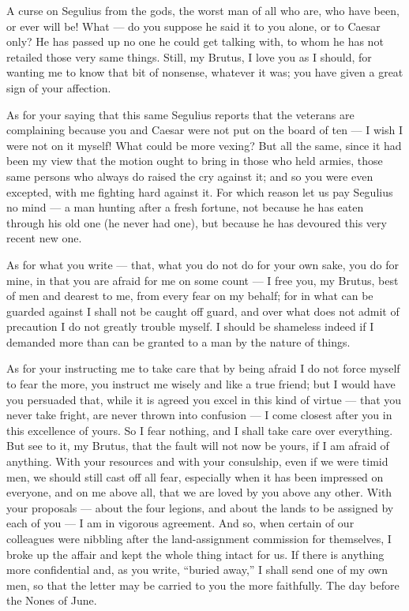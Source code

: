 

 A curse on Segulius from the gods, the worst man of all who are, who have been, or ever will be! What --- do you suppose he said it to you alone, or to Caesar only? He has passed up no one he could get talking with, to whom he has not retailed those very same things. Still, my Brutus, I love you as I should, for wanting me to know that bit of nonsense, whatever it was; you have given a great sign of your affection.

 As for your saying that this same Segulius reports that the veterans are complaining because you and Caesar were not put on the board of ten --- I wish I were not on it myself! What could be more vexing? But all the same, since it had been my view that the motion ought to bring in those who held armies, those same persons who always do raised the cry against it; and so you were even excepted, with me fighting hard against it. For which reason let us pay Segulius no mind --- a man hunting after a fresh fortune, not because he has eaten through his old one (he never had one), but because he has devoured this very recent new one.

 As for what you write --- that, what you do not do for your own sake, you do for mine, in that you are afraid for me on some count --- I free you, my Brutus, best of men and dearest to me, from every fear on my behalf; for in what can be guarded against I shall not be caught off guard, and over what does not admit of precaution I do not greatly trouble myself. I should be shameless indeed if I demanded more than can be granted to a man by the nature of things.

 As for your instructing me to take care that by being afraid I do not force myself to fear the more, you instruct me wisely and like a true friend; but I would have you persuaded that, while it is agreed you excel in this kind of virtue --- that you never take fright, are never thrown into confusion --- I come closest after you in this excellence of yours. So I fear nothing, and I shall take care over everything. But see to it, my Brutus, that the fault will not now be yours, if I am afraid of anything. With your resources and with your consulship, even if we were timid men, we should still cast off all fear, especially when it has been impressed on everyone, and on me above all, that we are loved by you above any other. With your proposals --- about the four legions, and about the lands to be assigned by each of you --- I am in vigorous agreement. And so, when certain of our colleagues were nibbling after the land-assignment commission for themselves, I broke up the affair and kept the whole thing intact for us. If there is anything more confidential and, as you write, ``buried away,'' I shall send one of my own men, so that the letter may be carried to you the more faithfully. The day before the Nones of June.
